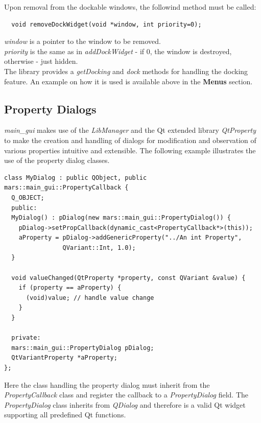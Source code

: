 \documentclass{article}
\begin{document}
Upon removal from the dockable windows, the followind method must be called:

\begin{lstlisting}
  void removeDockWidget(void *window, int priority=0);
\end{lstlisting}

\emph{window} is a pointer to the window to be removed.\\

\emph{priority} is the same as in \emph{addDockWidget} - if 0, the window is destroyed, otherwise - just hidden.\\

The library provides a \emph{getDocking} and \emph{dock} methods for handling the docking feature. An example on how it is used is available above in the {\bf Menus} section.





\subsection{Property Dialogs}

\emph{main\_gui} makes use of the \emph{LibManager} and the Qt extended library \emph{QtProperty} to make the creation and handling of dialogs for modification and observation of various properties intuitive and extensible. The following example illustrates the use of the property dialog classes. 

\begin{lstlisting}
class MyDialog : public QObject, public mars::main_gui::PropertyCallback {
  Q_OBJECT;
  public:
  MyDialog() : pDialog(new mars::main_gui::PropertyDialog()) {
    pDialog->setPropCallback(dynamic_cast<PropertyCallback*>(this));
    aProperty = pDialog->addGenericProperty("../An int Property", 
                QVariant::Int, 1.0);
  }
  
  void valueChanged(QtProperty *property, const QVariant &value) {
    if (property == aProperty) {
      (void)value; // handle value change
    }
  }

  private:
  mars::main_gui::PropertyDialog pDialog;
  QtVariantProperty *aProperty;
};
\end{lstlisting}

Here the class handling the property dialog must inherit from the \emph{PropertyCallback} class and register the callback to a \emph{PropertyDialog} field. The \emph{PropertyDialog} class inherits from \emph{QDialog} and therefore is a valid Qt widget supporting all predefined Qt functions. \\
\end{document}
